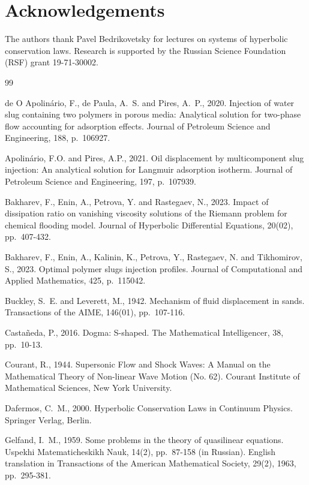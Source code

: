 \documentclass[12pt]{article}
\theoremstyle{definition}
\newenvironment{enbibliography}{\renewcommand{\refname}{{\large\sc References}}\vspace{-0.5cm}\begin{thebibliography}}{\end{thebibliography}}
\begin{document}
\section*{Acknowledgements}

The authors thank Pavel Bedrikovetsky for lectures on systems of hyperbolic conservation laws.
Research is supported by the Russian Science Foundation (RSF) grant 19-71-30002.
\bigskip
\bigskip

\begin{enbibliography}{99}

de O Apolin\'{a}rio, F., de Paula, A.~S. and Pires, A.~P., 2020. Injection of water slug containing two polymers in porous media: Analytical solution for two-phase flow accounting for adsorption effects. Journal of Petroleum Science and Engineering, 188, p.~106927.

Apolin\'{a}rio, F.O. and Pires, A.P., 2021. Oil displacement by multicomponent slug injection: An analytical solution for Langmuir adsorption isotherm. Journal of Petroleum Science and Engineering, 197, p.~107939.

Bakharev, F., Enin, A., Petrova, Y. and Rastegaev, N., 2023. Impact of dissipation ratio on vanishing viscosity solutions of the Riemann problem for chemical flooding model. Journal of Hyperbolic Differential Equations, 20(02), pp.~407-432.

Bakharev, F., Enin, A., Kalinin, K., Petrova, Y., Rastegaev, N. and Tikhomirov, S., 2023. Optimal polymer slugs injection profiles. Journal of Computational and Applied Mathematics, 425, p.~115042.

 Buckley, S.~E. and Leverett, M., 1942. Mechanism of fluid displacement in sands. Transactions of the AIME, 146(01), pp.~107-116.

Casta\~{n}eda, P., 2016. Dogma: S-shaped. The Mathematical Intelligencer, 38, pp.~10-13.

Courant, R., 1944. Supersonic Flow and Shock Waves: A Manual on the Mathematical Theory of Non-linear Wave Motion (No. 62). Courant Institute of Mathematical Sciences, New York University.

Dafermos, C.~M., 2000. Hyperbolic Conservation Laws in Continuum
Physics. Springer Verlag, Berlin.

Gelfand, I.~M., 1959. Some problems in the theory of quasilinear equations. Uspekhi Matematicheskikh Nauk, 14(2), pp.~87-158 (in Russian). English translation in Transactions of the American Mathematical Society, 29(2), 1963, pp.~295-381.


\end{enbibliography}
\end{document}
